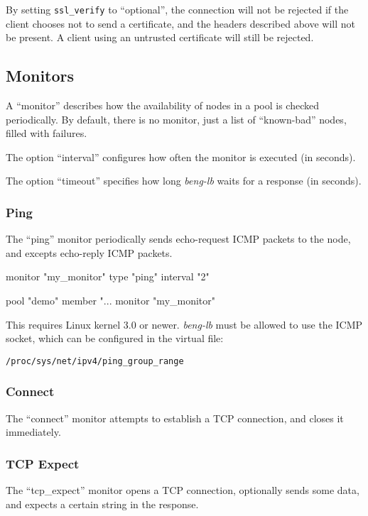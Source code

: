\documentclass[a4paper,12pt]{article}
\begin{document}
By setting \verb|ssl_verify| to ``optional'', the connection will not
be rejected if the client chooses not to send a certificate, and the
headers described above will not be present.  A client using an
untrusted certificate will still be rejected.

\subsection{Monitors}

A ``monitor'' describes how the availability of nodes in a pool is
checked periodically.  By default, there is no monitor, just a list of
``known-bad'' nodes, filled with failures.

The option ``interval'' configures how often the monitor is executed
(in seconds).

The option ``timeout'' specifies how long \emph{beng-lb} waits for a
response (in seconds).

\subsubsection{Ping}

The ``ping'' monitor periodically sends echo-request ICMP packets to
the node, and excepts echo-reply ICMP packets.

\begin{verbatim*}
monitor "my_monitor" {
  type "ping"
  interval "2"
}

pool "demo" {
  member "...
  monitor "my_monitor"
}
\end{verbatim*}

This requires Linux kernel 3.0 or newer.  \emph{beng-lb} must be
allowed to use the ICMP socket, which can be configured in the virtual
file:

\texttt{/proc/sys/net/ipv4/ping\_group\_range}

\subsubsection{Connect}

The ``connect'' monitor attempts to establish a TCP connection, and
closes it immediately.

\subsubsection{TCP Expect}

The ``tcp\_expect'' monitor opens a TCP connection, optionally sends
some data, and expects a certain string in the response.
\end{document}
